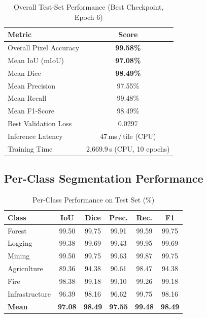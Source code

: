 \documentclass[10pt,conference]{IEEEtran}
\begin{document}
\begin{table}[!t]
  \caption{Overall Test-Set Performance (Best Checkpoint, Epoch 6)}
  \label{tab:overall}
  \centering
  \small
  \begin{tabular}{l c}
    \toprule
    \textbf{Metric} & \textbf{Score} \\
    \midrule
    Overall Pixel Accuracy & \textbf{99.58\%} \\
    Mean IoU (mIoU)        & \textbf{97.08\%} \\
    Mean Dice              & \textbf{98.49\%} \\
    Mean Precision         & 97.55\% \\
    Mean Recall            & 99.48\% \\
    Mean F1-Score          & 98.49\% \\
    \midrule
    Best Validation Loss   & 0.0297 \\
    Inference Latency      & 47\,ms\,/\,tile (CPU) \\
    Training Time          & 2{,}669.9\,s (CPU, 10 epochs) \\
    \bottomrule
  \end{tabular}
\end{table}

\subsection{Per-Class Segmentation Performance}

\begin{table}[!t]
  \caption{Per-Class Performance on Test Set (\%)}
  \label{tab:perclass}
  \centering
  \small
  \renewcommand{\arraystretch}{1.15}
  \begin{tabular}{l c c c c c}
    \toprule
    \textbf{Class} & \textbf{IoU} & \textbf{Dice} & \textbf{Prec.}
                   & \textbf{Rec.} & \textbf{F1} \\
    \midrule
    \rowcolor{rowforest}  Forest         & 99.50 & 99.75 & 99.91 & 99.59 & 99.75 \\
    \rowcolor{rowlog}     Logging        & 99.38 & 99.69 & 99.43 & 99.95 & 99.69 \\
    \rowcolor{rowmine}    Mining         & 99.50 & 99.75 & 99.63 & 99.87 & 99.75 \\
    \rowcolor{rowagri}    Agriculture    & 89.36 & 94.38 & 90.61 & 98.47 & 94.38 \\
    \rowcolor{rowfire}    Fire           & 98.38 & 99.18 & 99.10 & 99.26 & 99.18 \\
    \rowcolor{rowinfra}   Infrastructure & 96.39 & 98.16 & 96.62 & 99.75 & 98.16 \\
    \midrule
    \textbf{Mean}                        & \textbf{97.08} & \textbf{98.49}
                                         & \textbf{97.55} & \textbf{99.48}
                                         & \textbf{98.49} \\
    \bottomrule
  \end{tabular}
\end{table}
\end{document}
